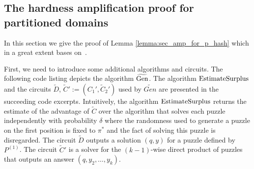 %
\subsection{The hardness amplification proof for partitioned domains}
\label{st:amplification_proof}
In this section we give the proof of Lemma \ref{lemma:sec_amp_for_p_hash} which in a great extent bases on~\cite{holenstein2011general}.

First, we need to introduce some additional algorithms and circuits.
The following code listing depicts the algorithm $\widetilde{\operatorname{\text{Gen}}}$.
The algorithm $\operatorname{\text{EstimateSurplus}}$ and the circuits $\widetilde{D}$, $\widetilde{C}' := (C_1',\widetilde{C}_2')$
used by $\widetilde{Gen}$ are presented in the succeeding code excerpts.
Intuitively, the algorithm $\operatorname{\text{EstimateSurplus}}$ returns the estimate of the advantage of $\widetilde{C}$
over the algorithm that solves each puzzle independently with probability $\delta$
where the randomness used to generate a puzzle on the first position is fixed to $\pi^*$
and the fact of solving this puzzle is disregarded.
The circuit $\widetilde{D}$ outputs a solution $(q,y)$ for a puzzle defined by~$P^{(1)}$.
The circuit $\widetilde{C}'$ is a solver for the $(k\!-\!1)$-wise direct product of puzzles that outputs an answer $(q, y_2, \dotsc, y_k)$.
%
